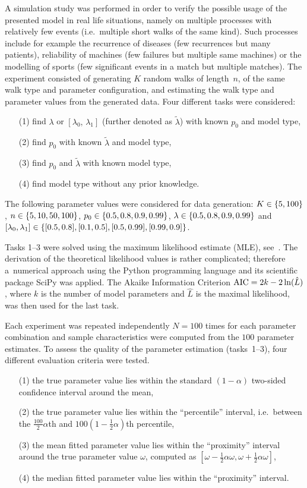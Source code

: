 A simulation study was performed in order to verify the possible usage of the
presented model in real life situations, namely on multiple processes
with relatively few events
(i.e.~multiple short walks of the same kind).
Such processes include for example the recurrence of diseases (few recurrences
but many patients), reliability of machines (few failures but multiple same machines)
or the modelling of sports (few significant events in a match but multiple matches).
The experiment consisted of generating $K$ random walks of length~$n$,\vadjust{\goodbreak}
of the same walk type and parameter configuration, and estimating the walk type and parameter values from the generated data.
Four different tasks were considered:
\begin{itemize}
\item[(1)] find $\lambda$ or $[\lambda_{0},\,\lambda_{1}]$ (further denoted as $\tilde{\lambda}$) with known $p_{0}$ and model type,
\item[(2)] find $p_{0}$ with known $\tilde{\lambda}$ and model type,
\item[(3)] find $p_{0}$ and $\tilde{\lambda}$ with known model type,
\item[(4)] find model type without any prior knowledge.
\end{itemize}
\bgroup\let\,\relax
The following parameter values were considered for data generation: $K\in\{5,\,100\}$, $n\in\{5,\,10,\,50,\,100\}$, $p_{0}\in\{0.5,\,0.8,\,0.9,\,0.99\}$, $\lambda\in\{0.5,\,0.8,\,0.9,\,0.99\}$ and $[\lambda_{0},\,\lambda_{1}]\in\{[0.5,\,0.8],\,[0.1,\,0.5],\,[0.5,\,0.99],\,[0.99,\,0.9]\}$.\egroup


Tasks 1--3 were solved using the maximum likelihood estimate (MLE), see~\cite{rossi2018mathematical}.
The derivation of the theoretical likelihood values is rather complicated; therefore a~numerical approach using the Python programming language and its scientific package SciPy was applied.
The Akaike Information Criterion ${\rm AIC}=2k-2\ln(\hat{L})$, where $k$ is the number of model parameters and $\hat{L}$ is the maximal likelihood, was then used for the last task.

Each experiment was repeated independently $N=100$ times for each parameter combination and sample characteristics were computed from the $100$ parameter estimates.
To assess the quality of the parameter estimation (tasks~1--3), four different evaluation criteria were tested.
\begin{itemize}
\item[(1)] the true parameter value lies within the standard $(1-\alpha)$ two-sided confidence interval around the mean,
\item[(2)] the true parameter value lies within the ``percentile'' interval, i.e.~between the $\frac{{100}}{2}\alpha$th and $100(1-\frac{1}{2}\alpha)$th percentile,
\item[(3)] the mean fitted parameter value lies within the ``proximity'' interval around the true parameter value $\omega$, computed as $[\omega-\frac{1}{2}\alpha\omega,\omega+\frac{1}{2}\alpha\omega]$,
\item[(4)] the median fitted parameter value lies within the ``proximity'' interval.
\end{itemize}

